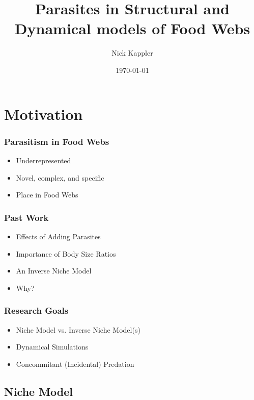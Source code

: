 \documentclass{beamer}
\title{Parasites in Structural and Dynamical models of Food Webs}
\author{Nick Kappler}
\date{\today}
\begin{document}
\frame{\titlepage}

\section[Outline]{}
\frame{\tableofcontents}

\section{Motivation}

\begin{frame}
\frametitle{Parasitism in Food Webs}
\begin{itemize}[<+->]
\item  Underrepresented
\item  Novel, complex, and specific
\item  Place in Food Webs
\end{itemize}
\end{frame}

\begin{frame}
\frametitle{Past Work}
\begin{itemize}[<+->]
\item  Effects of Adding Parasites %
\item  Importance of Body Size Ratios %
\item  An Inverse Niche Model %
\item  Why?
\end{itemize}
\end{frame}

\begin{frame}
\frametitle{Research Goals}
\begin{itemize}[<+->]
\item Niche Model vs. Inverse Niche Model(s)
\item  Dynamical Simulations
\item  Concommitant (Incidental) Predation
\end{itemize}
\end{frame}


\subsection{Niche Model}
\end{document}
